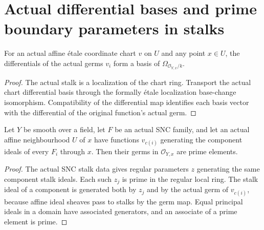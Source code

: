 \section{Actual differential bases and prime boundary parameters in stalks}

\begin{lemma}\label{lem:sc0-etale-stalk-differential-basis}
\leanok
{}
For an actual affine \'etale coordinate chart $v$ on $U$ and any point $x\in U$,
the differentials of the actual germs $v_i$ form a basis of
$\Omega_{\mathcal O_{Y,x}/k}$.
\end{lemma}
\begin{proof}
The actual stalk is a localization of the chart ring. Transport the actual chart
differential basis through the formally \'etale localization base-change
isomorphism. Compatibility of the differential map identifies each basis vector
with the differential of the original function's actual germ.
\end{proof}

\begin{lemma}\label{lem:sc0-snc-chart-prime-germs}
\leanok
{}
Let $Y$ be smooth over a field, let $F$ be an actual SNC family, and let an
actual affine neighbourhood $U$ of $x$ have functions $v_{c(i)}$ generating the
component ideals of every $F_i$ through $x$. Then their germs in
$\mathcal O_{Y,x}$ are prime elements.
\end{lemma}
\begin{proof}
The actual SNC stalk data gives regular parameters $z$ generating the same
component stalk ideals. Each such $z_j$ is prime in the regular local ring.
The stalk ideal of a component is generated both by $z_j$ and by the actual
germ of $v_{c(i)}$, because affine ideal sheaves pass to stalks by the germ map.
Equal principal ideals in a domain have associated generators, and an associate
of a prime element is prime.
\end{proof}
